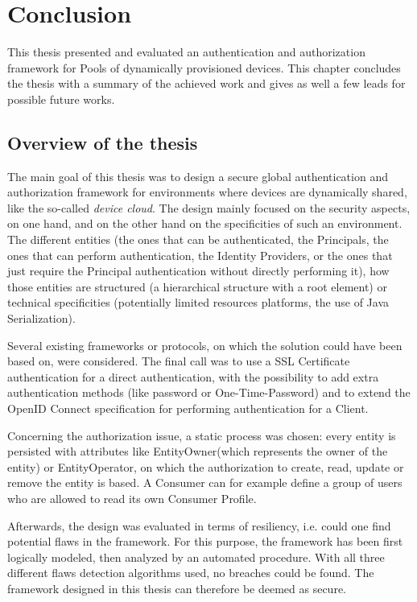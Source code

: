 \chapter{Conclusion}
\label{cha:conclusion}

This thesis presented and evaluated an authentication and authorization framework for  Pools of dynamically provisioned devices. This chapter concludes the thesis with a summary of the achieved work and gives as well a few leads for possible future works.

\section{Overview of the thesis}
The main goal of this thesis was to design a secure global authentication and authorization framework for environments where devices are dynamically shared, like the so-called \emph{device cloud}. The design mainly focused on the security aspects, on one hand, and on the other hand on the specificities of such an environment. The different entities (the ones that can be authenticated, the Principals, the ones that can perform authentication, the Identity Providers, or the ones that just require the Principal authentication without directly performing it), how those entities are structured (a hierarchical structure with a root element) or technical specificities (potentially limited resources platforms, the use of Java Serialization). 

Several existing frameworks or protocols, on which the solution could have been based on, were considered. The final call was to use a SSL Certificate authentication for a direct authentication, with the possibility to add extra authentication methods (like password or One-Time-Password) and to extend the OpenID Connect specification for performing authentication for a Client.

Concerning the authorization issue, a static process was chosen: every entity is persisted with attributes like EntityOwner(which represents the owner of the entity) or EntityOperator, on which the authorization to create, read, update or remove the entity is based. A Consumer can for example define a group of users who are allowed to read its own Consumer Profile.

Afterwards, the design was evaluated in terms of resiliency, i.e. could one find potential flaws in the framework. For this purpose, the framework has been first logically modeled, then analyzed by an automated procedure. With all three different flaws detection algorithms used, no breaches could be found. The framework designed in this thesis can therefore be deemed as secure.

